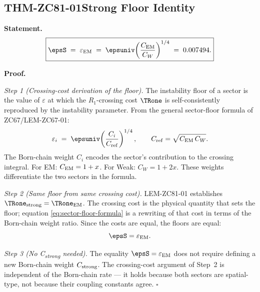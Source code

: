 \documentclass[12pt, a4paper]{article}
\renewcommand{\epsEM}{\varepsilon_{\rm EM}}
\begin{document}
\subsection{THM-ZC81-01\quad Strong Floor Identity}
\label{sec:thm01}


\begin{formalbox}[title={THM-ZC81-01: Strong Floor Identity
  ($R_0$, Exact)}]

\textbf{Statement.}
\begin{equation}
  \boxed{
    \epsS
    \;=\; \epsEM
    \;=\; \epsuniv\!\left(\frac{C_{\rm EM}}{C_W}\right)^{1/4}
    \;=\; 0.007494.
  }
  \label{eq:strong-floor}
\end{equation}

\textbf{Proof.}

\textit{Step 1 (Crossing-cost derivation of the floor).}
The instability floor of a sector is the value of $\varepsilon$
at which the $R_1$-crossing cost $\TRone$ is self-consistently
reproduced by the instability parameter. From the general
sector-floor formula of ZC67/LEM-ZC67-01:
\begin{equation}
  \varepsilon_i
  \;=\; \epsuniv\!\left(\frac{C_i}{C_{\rm ref}}\right)^{1/4},
  \qquad C_{\rm ref} = \sqrt{C_{\rm EM}\,C_W}.
  \label{eq:sector-floor-formula}
\end{equation}
The Born-chain weight $C_i$ encodes the sector's contribution
to the crossing integral. For EM: $C_{\rm EM} = 1+x$. For
Weak: $C_W = 1+2x$. These weights differentiate the two sectors
in the formula.

\textit{Step 2 (Same floor from same crossing cost).}
LEM-ZC81-01 establishes $\TRone_{\rm strong} = \TRone_{\rm EM}$.
The crossing cost is the physical quantity that sets the floor;
equation \eqref{eq:sector-floor-formula} is a rewriting of
that cost in terms of the Born-chain weight ratio. Since the
costs are equal, the floors are equal:
\begin{equation}
  \epsS = \epsEM.
  \label{eq:floor-equal}
\end{equation}

\textit{Step 3 (No C\textsubscript{strong} needed).}
The equality $\epsS = \epsEM$ does not require defining a new
Born-chain weight $C_{\rm strong}$. The crossing-cost argument
of Step~2 is independent of the Born-chain rate --- it holds
because both sectors are spatial-type, not because their
coupling constants agree. \hfill$\square$


\end{formalbox}
\end{document}
